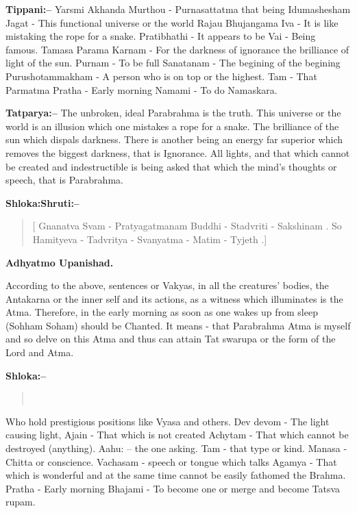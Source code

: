 \textbf{Tippani:–} Yarsmi Akhanda Murthou - Purnasattatma that being Idumashesham Jagat - This functional universe or the world Rajau Bhujangama Iva - It is like mistaking the rope for a snake. Pratibhathi - It appears to be Vai - Being famous. Tamasa Parama Karnam - For the darkness of ignorance the brilliance of light of the sun. Purnam - To be full Sanatanam - The begining of the begining Purushotammakham - A person who is on top or the highest. Tam - That Parmatma Pratha - Early morning Namami - To do Namaskara.

\textbf{Tatparya:–} The unbroken, ideal Parabrahma is the truth. This universe or the world is an illusion which one mistakes a rope for a snake. The brilliance of the sun which dispals darkness. There is another being an energy far superior which removes the biggest darkness, that is Ignorance. All lights, and that which cannot be created and indestructible is being asked that which the mind's thoughts or speech, that is Parabrahma.

\textbf{Shloka:Shruti:–}

\begin{verse}
[ Gnanatva Svam - Pratyagatmanam Buddhi - Stadvriti - Sakshinam . So Hamityeva - Tadvritya - Svanyatma - Matim - Tyjeth .]
\end{verse}

\begin{flushright}
\textbf{Adhyatmo Upanishad.}
\end{flushright}

According to the above, sentences or Vakyas, in all the creatures' bodies, the Antakarna or the inner self and its actions, as a witness which illuminates is the Atma. Therefore, in the early morning as soon as one wakes up from sleep (Sohham Soham) should be Chanted. It means - that Parabrahma Atma is myself and so delve on this Atma and thus can attain Tat swarupa or the form of the Lord and Atma.

\textbf{Shloka:–}

\begin{verse}
 \\
\end{verse}

Who hold prestigious positions like Vyasa and others. Dev devom - The light causing light, Ajain - That which is not created Achytam - That which cannot be destroyed (anything). Aahu: – the one asking. Tam - that type or kind. Manasa - Chitta or conscience. Vachasam - speech or tongue which talks Agamya - That which is wonderful and at the same time cannot be easily fathomed the Brahma. Pratha - Early morning Bhajami - To become one or merge and become Tatsva rupam.


